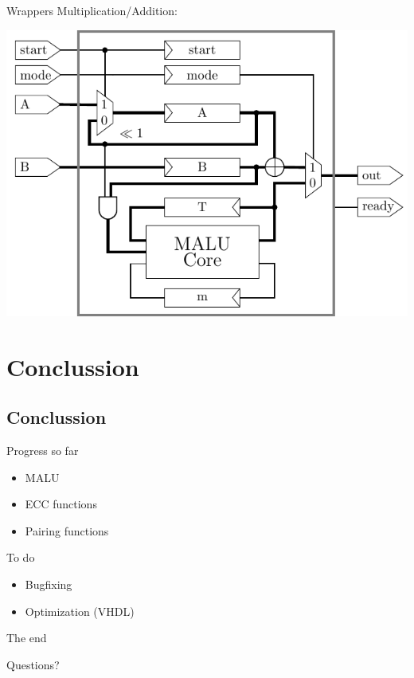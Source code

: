 \documentclass{beamer}
\begin{document}
\begin{frame}{Wrappers}
	Multiplication/Addition:\\
	\begin{center}
		\includegraphics[height=0.55\paperheight]{images/malu-wrapper}
	\end{center}
\end{frame}


\section{Conclussion}
\subsection*{Conclussion}
\begin{frame}{Progress so far}
	\begin{itemize}
		\item MALU
		\item ECC functions
		\item Pairing functions
	\end{itemize}
\end{frame}

\begin{frame}{To do}
	\begin{itemize}
		\item Bugfixing
		\item Optimization (VHDL)
	\end{itemize}
\end{frame}

\begin{frame}{The end}
	\begin{center}\LARGE Questions?\end{center}
\end{frame}
\end{document}
